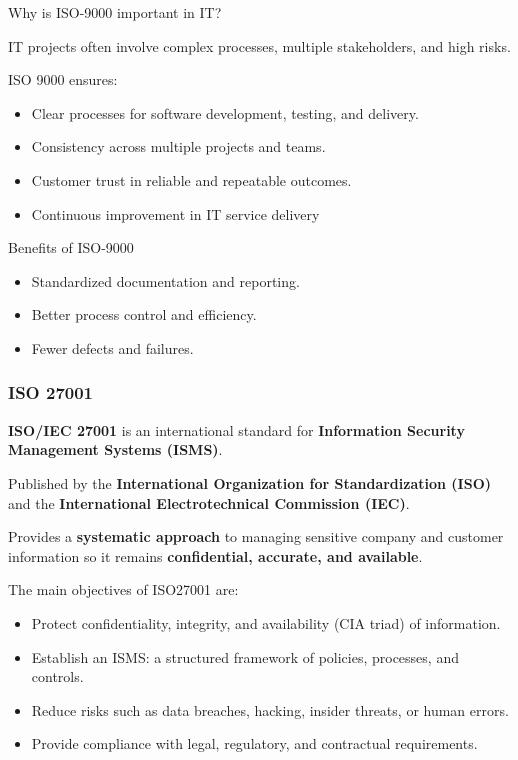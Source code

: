 \bigskip

\noindent Why is ISO-9000 important in IT?

IT projects often involve complex processes, multiple stakeholders, and high risks.

ISO 9000 ensures:

\begin{itemize}
    \item Clear processes for software development, testing, and delivery.
    \item Consistency across multiple projects and teams.
    \item Customer trust in reliable and repeatable outcomes.
    \item Continuous improvement in IT service delivery
\end{itemize}

\bigskip

\noindent Benefits of ISO-9000

\begin{itemize}
    \item Standardized documentation and reporting.
    \item Better process control and efficiency.
    \item Fewer defects and failures.
\end{itemize}

\subsubsection{ISO 27001}

\indent

\textbf{ISO/IEC 27001} is an international standard for \textbf{Information Security Management Systems (ISMS)}.

Published by the \textbf{International Organization for Standardization (ISO)} and the \textbf{International Electrotechnical Commission (IEC)}.

Provides a \textbf{systematic approach} to managing sensitive company and customer information so it remains \textbf{confidential, accurate, and available}.

\bigskip

\noindent The main objectives of ISO27001 are:

\begin{itemize}
    \item Protect confidentiality, integrity, and availability (CIA triad) of information.
    \item Establish an ISMS: a structured framework of policies, processes, and controls.
    \item Reduce risks such as data breaches, hacking, insider threats, or human errors.
    \item Provide compliance with legal, regulatory, and contractual requirements.
\end{itemize}

